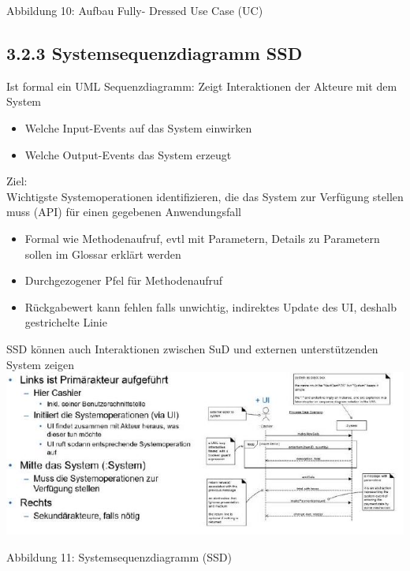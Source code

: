 Abbildung 10: Aufbau Fully- Dressed Use Case (UC)

\subsection*{3.2.3 Systemsequenzdiagramm SSD}
Ist formal ein UML Sequenzdiagramm: Zeigt Interaktionen der Akteure mit dem System

\begin{itemize}
  \item Welche Input-Events auf das System einwirken
  \item Welche Output-Events das System erzeugt
\end{itemize}

Ziel:\\
Wichtigste Systemoperationen identifizieren, die das System zur Verfügung stellen muss (API) für einen gegebenen Anwendungsfall

\begin{itemize}
  \item Formal wie Methodenaufruf, evtl mit Parametern, Details zu Parametern sollen im Glossar erklärt werden
  \item Durchgezogener Pfel für Methodenaufruf
  \item Rückgabewert kann fehlen falls unwichtig, indirektes Update des UI, deshalb gestrichelte Linie
\end{itemize}

SSD können auch Interaktionen zwischen SuD und externen unterstützenden System zeigen\\
\includegraphics[width=\textwidth]{images/2024_12_29_0d1d7b5551ea1b4b41bdg-06}

Abbildung 11: Systemsequenzdiagramm (SSD)